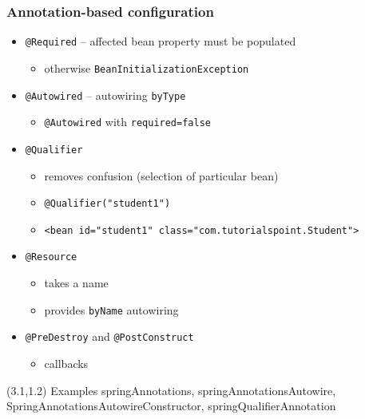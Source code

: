 \documentclass[10pt,xcolor=pdflatex, table]{beamer}
\begin{document}
\begin{frame}[fragile]\frametitle{Annotation-based configuration}
	\begin{itemize}
		\item \texttt{@Required} -- affected bean property must be populated
          \begin{itemize}
        	\item otherwise \texttt{BeanInitializationException}
          \end{itemize}
		\item \texttt{@Autowired} -- autowiring \texttt{byType}
          \begin{itemize}
        	\item \texttt{@Autowired} with \texttt{required=false} 
          \end{itemize}
		\item \texttt{@Qualifier}
          \begin{itemize}
        	\item removes confusion (selection of particular bean)
            \item[] \texttt{@Qualifier("student1")}\\[0.2cm]
            \item[] {\footnotesize \verb+<bean id="student1" class="com.tutorialspoint.Student">+}
          \end{itemize}
        \item \texttt{@Resource}
          \begin{itemize}
        	\item takes a name
        	\item provides \texttt{byName} autowiring 
          \end{itemize}
		\item \texttt{@PreDestroy} and \texttt{@PostConstruct}
          \begin{itemize}
        	\item callbacks
          \end{itemize}
	\end{itemize}
\begin{textblock}{15}(3.1,1.2)
    {\footnotesize Examples springAnnotations, springAnnotationsAutowire, SpringAnnotationsAutowireConstructor, springQualifierAnnotation}
\end{textblock}
\end{frame}
\end{document}
